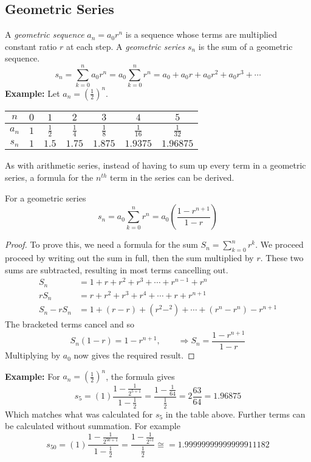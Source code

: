\documentclass[11pt,a4paper,titlepage,oneside,openany]{article}
\begin{document}
\pagebreak
\subsection*{Geometric Series}
A \emph{geometric sequence} $a_n=a_0 r^n$ is a sequence whose terms are multiplied constant ratio $r$ at each step. A \emph{geometric series} $s_n$ is the sum of a geometric sequence.
\begin{equation*}
  s_n=\sum_{k=0}^n a_0 r^n =  a_0 \sum_{k=0}^n r^n = a_0 + a_0r +a_0 r^2+a_0 r^3 + \cdots 
\end{equation*}
\noindent \textbf{Example:} Let $a_n=\left(\frac{1}{2}\right)^n$.
\begin{center}
\begin{tabular}{c|c|c|c|c|c|c}
$n$ & $0$ & $1$ & $2$ & $3$ & $4$ & $5$   \\ \hline
$a_n$ & $1$ & $\frac{1}{2}$ & $\frac{1}{4}$ & $\frac{1}{8}$ & $\frac{1}{16}$ & $\frac{1}{32}$  \\ \hline
$s_n$ & $1$ & $1.5$ & $1.75$ & $1.875$ & $1.9375$ & $1.96875$ 
\end{tabular}
\end{center}
As with arithmetic series, instead of having to sum up every term in a geometric series, a formula for the $n^{th}$ term in the series can be derived.
\begin{thm*}
  For a geometric series
  \begin{equation*}
    s_n = a_0 \sum_{k=0}^n r^n= a_0 \left( \frac{1-r^{n+1}}{1-r} \right)
  \end{equation*}
\begin{proof}
To prove this, we need a formula for the sum $S_n=\sum_{k=0}^n r^k$. We proceed proceed by writing out the sum in full, then the sum multiplied by $r$. These two sums are subtracted, resulting in most terms cancelling out.
  \begin{align*}
    S_n&=1+r+r^2+r^3+\cdots+r^{n-1}+r^n\\
    r S_n&=r+r^2+r^3+r^4+\cdots+r+r^{n+1}\\
    S_n-r S_n&= 1 + (r - r) + (r^2-^2)+\cdots+(r^n-r^n)-r^{n+1}
  \end{align*}
The bracketed terms cancel and so
\begin{equation*}
  S_n(1-r)=1 -r^{n+1}, \qquad \Rightarrow S_n=\frac{1-r^{n+1}}{1-r}
\end{equation*}
Multiplying by $a_0$ now gives the required result.
\end{proof}
\end{thm*}
\noindent  \textbf{Example:}
For $a_n=\left(\frac{1}{2}\right)^n$, the formula gives
\begin{equation*}
  s_5=(1)\frac{1-\frac{1}{2^{5+1}}}{1-\frac{1}{2}}=\frac{1-\frac{1}{64}}{\frac{1}{2}}=2\frac{63}{64}=1.96875
\end{equation*}
Which matches what was calculated for $s_5$ in the table above. Further terms can be calculated without summation. For example
\begin{equation*}
  s_{50}=(1)\frac{1-\frac{1}{2^{50+1}}}{1-\frac{1}{2}}=\frac{1-\frac{1}{2^{51}}}{\frac{1}{2}} \cong=1.99999999999999911182
\end{equation*}
\end{document}
